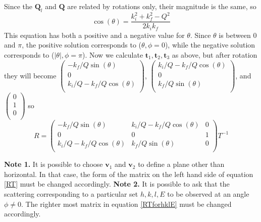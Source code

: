 \documentclass[prb]{revtex4}%
\begin{document}
Since the $\textbf{Q}_l$ and $\textbf{Q}$ are related by rotations only, their magnitude is the same, so
\begin{equation}
    \cos(\theta) = \frac{k^2_i + k^2_f - Q^2}{2 k_i k_f}
\end{equation}
This equation has both a positive  and a negative value for $\theta$. Since $\theta$
is between 0 and $\pi$, the positive solution corresponds to ($\theta, \phi=0$), while the
negative solution corresponds to ($|\theta|, \phi=\pi$).
Now we calculate $\textbf{t}_1, \textbf{t}_2, \textbf{t}_3$ as above, but after rotation they will become
$\left(
   \begin{array}{c}
     -k_f/Q \sin(\theta) \\
     0 \\
     k_i/Q-k_f/Q \cos(\theta) \\
   \end{array}
 \right)$, $\left(
   \begin{array}{c}
     k_i/Q-k_f/Q \cos(\theta) \\
     0 \\
     k_f/Q \sin(\theta) \\
   \end{array}
 \right)$, and $\left(
   \begin{array}{c}
     0 \\
     1 \\
     0 \\
   \end{array}
 \right)$
so
\begin{equation}\label{RTforhklE}
    R= \left(
               \begin{array}{ccc}
                 -k_f/Q \sin(\theta) & k_i/Q-k_f/Q \cos(\theta) & 0 \\
                 0 & 0 & 1 \\
                  k_i/Q-k_f/Q \cos(\theta) & k_f/Q \sin(\theta) & 0 \\
               \end{array}
             \right)T^{-1}
\end{equation}

\textbf{Note 1.} It is possible to choose $\textbf{v}_1$ and $\textbf{v}_2$ to define a plane
other than horizontal. In that case, the form of the matrix on the left hand side of equation
\ref{RT} must be changed accordingly.
\textbf{Note 2.} It is possible to ask that the scattering corresponding to a particular
set $h, k, l, E$ to be observed at an angle $\phi\neq0$. The righter most matrix in
equation \ref{RTforhklE} must be changed accordingly.
\end{document}
